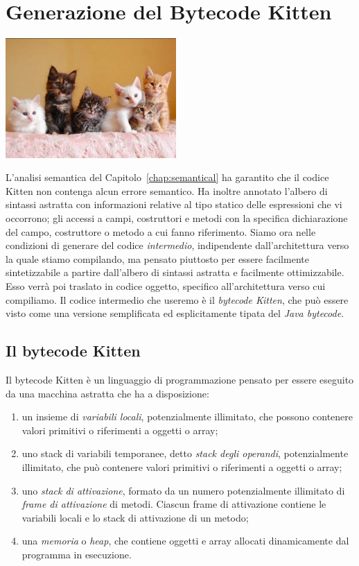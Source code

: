 \chapter{Generazione del Bytecode Kitten}\label{chap:translate}
%
\vspace*{-2ex}
\begin{center}
\includegraphics[width=6.5cm]{cat9.jpg}
\end{center}
%
L'analisi semantica del Capitolo~\ref{chap:semantical} ha garantito che
il codice Kitten non contenga alcun errore semantico. Ha inoltre
annotato l'albero di sintassi astratta con informazioni relative
al tipo statico delle espressioni che vi occorrono; gli accessi a
campi, costruttori e metodi con la specifica dichiarazione
del campo, costruttore
o metodo a cui fanno riferimento. Siamo ora nelle condizioni di
generare del codice \emph{intermedio}, \cioe indipendente dall'architettura
verso la quale stiamo compilando, ma pensato piuttosto per essere
facilmente sintetizzabile a partire dall'albero di sintassi astratta
e facilmente ottimizzabile. Esso verr\`a poi traslato in codice oggetto,
specifico all'architettura verso cui compiliamo.
Il codice intermedio che useremo \`e il \emph{bytecode Kitten}, che pu\`o
essere visto come una versione semplificata ed esplicitamente tipata del
\emph{Java bytecode}.
%
\section{Il bytecode Kitten}
%
Il bytecode Kitten \`e un linguaggio di programmazione pensato per
essere eseguito da una macchina astratta che ha a disposizione:
%
\begin{enumerate}
\item un insieme di \emph{variabili locali}, potenzialmente illimitato, che
      possono contenere valori primitivi o riferimenti a oggetti o array;
\item uno stack di variabili temporanee, detto \emph{stack degli operandi},
      potenzialmente illimitato, che pu\`o contenere valori primitivi o
      riferimenti a oggetti o array;
\item uno \emph{stack di attivazione}, formato da un numero potenzialmente
      illimitato di \emph{frame di attivazione} di metodi. Ciascun frame
      di attivazione contiene le variabili locali e lo stack di attivazione
      di un metodo;
\item una \emph{memoria} o \emph{heap}, che contiene oggetti e array
      allocati dinamicamente dal programma in esecuzione.
\end{enumerate}

